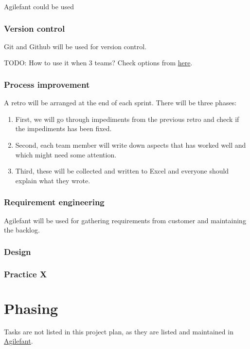 Agilefant could be used

\subsubsection{Version control}

Git and Github will be used for version control. 

TODO: How to use it when 3 teams? Check options from 
\href{https://www.atlassian.com/git/workflows}{here}.

\subsubsection{Process improvement}

A retro will be arranged at the end of each sprint. There will be three phases:

\begin{enumerate}
\item First, we will go through impediments from the previous retro and check 
if the impediments has been fixed.
\item Second, each team member will write down aspects that has worked well and 
which might need some attention.
\item Third, these will be collected and written to Excel and everyone should 
explain what they wrote.
\end{enumerate}

\subsubsection{Requirement engineering}

Agilefant will be used for gathering requirements from customer and maintaining 
the backlog. 

\subsubsection{Design}

\subsubsection{Practice X}

\section{Phasing}

Tasks are not listed in this project plan, as they are listed and maintained in 
\href{https://cloud.agilefant.com/dev/}{Agilefant}.

